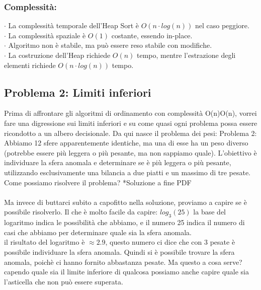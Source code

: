 \documentclass[a4paper,12pt]{article}
\begin{document}
\subsubsection*{\textcolor{teorema}{{Complessità:}}}
$\cdot $ La complessità temporale dell'Heap Sort è $O(n \cdot log(n))$ nel caso peggiore. \\
$\cdot $ La complessità spaziale è $O(1)$ costante, essendo in-place. \\
$\cdot $ Algoritmo non è stabile, ma può essere reso stabile con modifiche. \\
$\cdot $ La costruzione dell'Heap richiede $O(n)$ tempo, mentre l'estrazione degli elementi richiede $O(n \cdot log(n))$ tempo. \\


\subsection{Problema 2: Limiti inferiori}
Prima di affrontare gli algoritmi di ordinamento con complessità O(n)O(n), vorrei fare una digressione sui limiti inferiori e su come quasi ogni problema possa essere ricondotto a un albero decisionale.
Da qui nasce il problema dei pesi:
Problema 2: Abbiamo 12 sfere apparentemente identiche, ma una di esse ha un peso diverso (potrebbe essere più leggera o più pesante, ma non sappiamo quale).
L'obiettivo è individuare la sfera anomala e determinare se è più leggera o più pesante, utilizzando esclusivamente una bilancia a due piatti e un massimo di tre pesate.
Come possiamo risolvere il problema? {\tiny{*Soluzione a fine PDF}}\\
\\
Ma invece di buttarci subito a capofitto nella soluzione, proviamo a capire se è possibile risolverlo.
Il che è molto facile da capire: $log_{3}(25)$ la base del logaritmo indica le possibilità che abbiamo, e il numero 25 indica il numero di casi  che abbiamo per determinare quale sia la sfera anomala. \\
il risultato del logaritmo è $\approx  2.9$, questo numero ci dice che con 3 pesate è possibile individuare la sfera anomala. Quindi si è possibile trovare la sfera anomala,  poichè ci hanno fornito abbastanza pesate.
Ma questo a cosa serve? capendo quale sia il limite inferiore di qualcosa possiamo anche capire quale sia l'asticella che non può essere superata.
\end{document}
